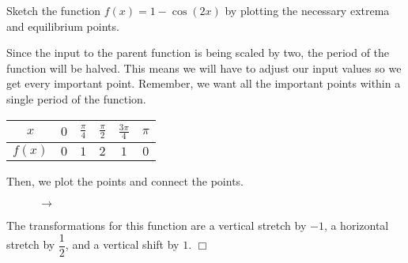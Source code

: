 \documentclass[../book.tex]{subfiles}
\begin{document}
\begin{example}
Sketch the function $f(x)=1-\cos(2x)$ by plotting the necessary extrema and equilibrium points.
\end{example}
\begin{solution}
Since the input to the parent function is being scaled by two, the period of the function will be halved. This means we will have to adjust our input values so we get every important point. Remember, we want all the important points within a single period of the function.
\begin{table}[!ht]
    \centering
    \begin{tabular}{|c||c|c|c|c|c|}
        \toprule
        $x$ & $0$ & $\frac{\pi}{4}$ & $\frac{\pi}{2}$ & $\frac{3\pi}{4}$ & $\pi$ \\
        \midrule
        $f(x)$ & $0$ & $1$ & $2$ & $1$ & $0$ \\
        \bottomrule
    \end{tabular}
\end{table}

Then, we plot the points and connect the points.
\begin{figure}[!ht]
    \centering
     $\to$ 
\end{figure}

The transformations for this function are a vertical stretch by $-1$, a horizontal stretch by $\dfrac{1}{2}$, and a vertical shift by $1$. $\Box$
\end{solution}
\end{document}
